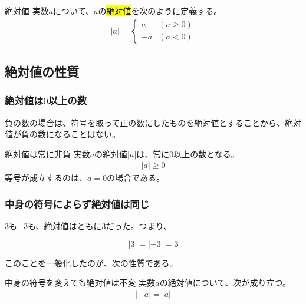 \documentclass[../math-imaging]{subfiles}
\begin{document}
\begin{definition}{絶対値}
  \newline
  実数$a$について、$a$の\hl{絶対値}を次のように定義する。
  \LARGE
  \begin{align}
    |a| = \begin{cases}
            a  & (a \geq  0) \\
            -a & (a < 0)
          \end{cases}
  \end{align}
\end{definition}

\subsection{絶対値の性質}

\subsubsection{絶対値は$0$以上の数}

負の数の場合は、符号を取って正の数にしたものを絶対値とすることから、絶対値が負の数になることはない。

\begin{theorem}{絶対値は常に非負}
  \newline
  実数$a$の絶対値$|a|$は、常に$0$以上の数となる。
  \LARGE
  \begin{align}
    |a| \geq 0
  \end{align}
  \normalsize
  等号が成立するのは、$a=0$の場合である。
\end{theorem}

\subsubsection{中身の符号によらず絶対値は同じ}

$3$も$-3$も、絶対値はともに$3$だった。つまり、

\begin{equation}
  |3| = |-3| = 3
\end{equation}

このことを一般化したのが、次の性質である。

\begin{theorem}{中身の符号を変えても絶対値は不変}
  \newline
  実数$a$の絶対値について、次が成り立つ。
  \LARGE
  \begin{align}
    |-a| = |a|
  \end{align}
\end{theorem}
\end{document}
